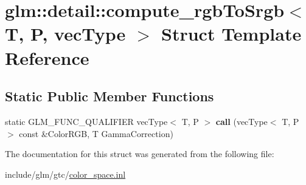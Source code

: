 \hypertarget{structglm_1_1detail_1_1compute__rgbToSrgb}{}\section{glm\+:\+:detail\+:\+:compute\+\_\+rgb\+To\+Srgb$<$ T, P, vec\+Type $>$ Struct Template Reference}
\label{structglm_1_1detail_1_1compute__rgbToSrgb}
\subsection*{Static Public Member Functions}
\begin{DoxyCompactItemize}
\item 
\mbox{\label{structglm_1_1detail_1_1compute__rgbToSrgb_a641d15ac773c5b20ad9917ec0ea2974c}} 
static G\+L\+M\+\_\+\+F\+U\+N\+C\+\_\+\+Q\+U\+A\+L\+I\+F\+I\+ER vec\+Type$<$ T, P $>$ {\bfseries call} (vec\+Type$<$ T, P $>$ const \&Color\+R\+GB, T Gamma\+Correction)
\end{DoxyCompactItemize}


The documentation for this struct was generated from the following file\+:\begin{DoxyCompactItemize}
\item 
include/glm/gtc/\hyperlink{gtc_2color__space_8inl}{color\+\_\+space.\+inl}\end{DoxyCompactItemize}
